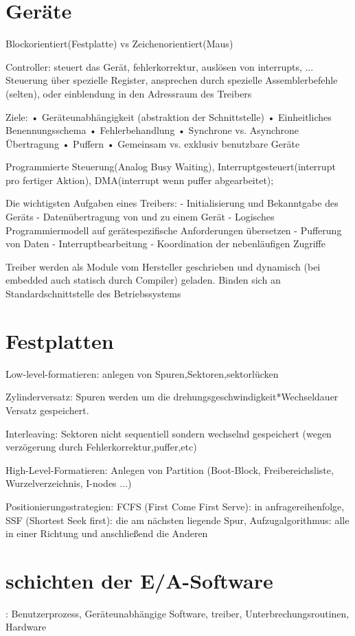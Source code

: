 \section*{Geräte}
Blockorientiert(Festplatte) vs Zeichenorientiert(Maus)

Controller: steuert das Gerät, fehlerkorrektur, auslösen von interrupts, ...
Steuerung über spezielle Register, ansprechen durch spezielle Assemblerbefehle (selten), oder einblendung in den Adressraum des Treibers

Ziele:
• Geräteunabhängigkeit (abstraktion der Schnittstelle)
• Einheitliches Benennungsschema
• Fehlerbehandlung
• Synchrone vs. Asynchrone Übertragung
• Puffern
• Gemeinsam vs. exklusiv benutzbare Geräte

Programmierte Steuerung(Analog Busy Waiting), Interruptgesteuert(interrupt pro fertiger Aktion), DMA(interrupt wenn puffer abgearbeitet);

Die wichtigsten Aufgaben eines Treibers:
- Initialisierung und Bekanntgabe des Geräts
- Datenübertragung von und zu einem Gerät
- Logisches Programmiermodell auf gerätespezifische
Anforderungen übersetzen
- Pufferung von Daten
- Interruptbearbeitung
- Koordination der nebenläufigen Zugriffe

Treiber werden als Module vom Hersteller geschrieben und dynamisch (bei embedded auch statisch durch Compiler) geladen. Binden sich an Standardschnittstelle des Betriebssystems

\section*{Festplatten}
Low-level-formatieren: anlegen von Spuren,Sektoren,sektorlücken

Zylinderversatz: Spuren werden um die drehungsgeschwindigkeit*Wechseldauer Versatz gespeichert.

Interleaving: Sektoren nicht sequentiell sondern wechselnd gespeichert (wegen verzögerung durch Fehlerkorrektur,puffer,etc)

High-Level-Formatieren:
Anlegen von Partition (Boot-Block, Freibereichsliste, Wurzelverzeichnis, I-nodes ...)

Positionierungsstrategien: FCFS (First Come First Serve): in anfragereihenfolge,
SSF (Shortest Seek first): die am nächsten liegende Spur, Aufzugalgorithmus: alle in einer Richtung und anschließend die Anderen




\section*{schichten der E/A-Software}: Benutzerprozess, Geräteunabhängige Software, treiber, Unterbrechungsroutinen, Hardware 